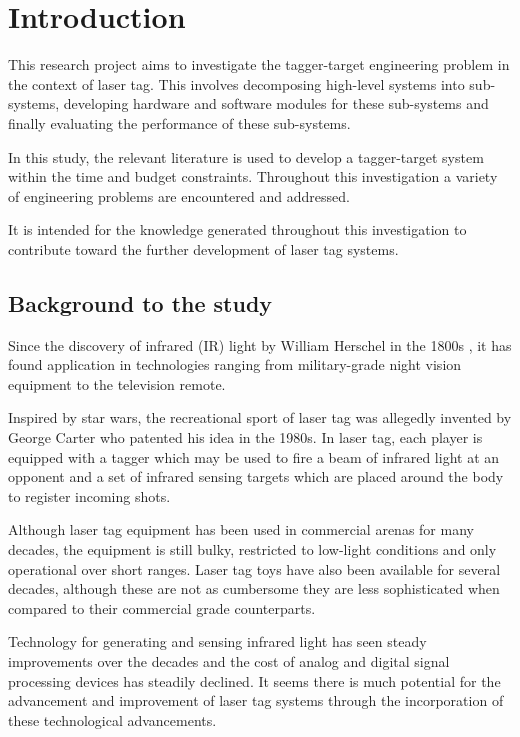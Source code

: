 \chapter{Introduction}
\label{ch_introduction}

This research project aims to investigate the tagger-target engineering problem in the context of laser tag.  This involves decomposing high-level systems into sub-systems, developing hardware and software modules for these sub-systems and finally evaluating the performance of these sub-systems.

In this study, the relevant literature is used to develop a tagger-target system within the time and budget constraints. Throughout this investigation a variety of engineering problems are encountered and addressed.

It is intended for the knowledge generated throughout this investigation to contribute toward the further development of laser tag systems.

\section{Background to the study}
Since the discovery of infrared (IR) light by William Herschel in the 1800s \cite{Rowan-Robinson2013}, it has found application in technologies ranging from military-grade night vision equipment to the television remote.

Inspired by star wars, the recreational sport of laser tag was allegedly invented by George Carter who patented his idea in the 1980s\cite{Carter1986}. In laser tag, each player is equipped with a tagger which may be used to fire a beam of infrared light at an opponent and a set of infrared sensing targets which are placed around the body to register incoming shots.

Although laser tag equipment has been used in commercial arenas for many decades, the equipment is still bulky, restricted to low-light conditions and only operational over short ranges. Laser tag toys have also been available for several decades, although these are not as cumbersome they are less sophisticated when compared to their commercial grade counterparts.

Technology for generating and sensing infrared light has seen steady improvements over the decades and the cost of analog and digital signal processing devices has steadily declined. It seems there is much potential for the advancement and improvement of laser tag systems through the incorporation of these technological advancements.

